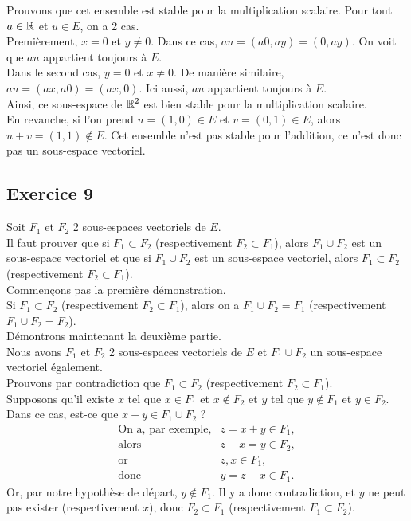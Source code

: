 \documentclass[12pt]{book}
\begin{document}
Prouvons que cet ensemble est stable pour la multiplication scalaire. Pour tout $a\in\mathbb{R}$ et $u\in E$, on a 2 cas.\\
Premièrement, $x=0$ et $y\ne 0$. Dans ce cas, $au=(a0,ay)=(0,ay)$. On voit que $au$ appartient toujours à $E$.\\
Dans le second cas, $y=0$ et $x\ne 0$. De manière similaire, $au=(ax,a0)=(ax,0)$. Ici aussi, $au$ appartient toujours à $E$.\\
Ainsi, ce sous-espace de $\mathbb{R}^2$ est bien stable pour la multiplication scalaire.\\

En revanche, si l’on prend $u=(1,0)\in E$ et $v=(0,1)\in E$, alors $u+v=(1,1)\notin E$. Cet ensemble n’est pas stable pour l’addition, ce n’est donc pas un sous-espace vectoriel.

\subsection*{Exercice 9}

Soit $F_1$ et $F_2$ 2 sous-espaces vectoriels de $E$.\\
Il faut prouver que si $F_1\subset F_2$ (respectivement $F_2\subset F_1$), alors $F_1\cup F_2$ est un sous-espace vectoriel et que si $F_1\cup F_2$ est un sous-espace vectoriel, alors $F_1\subset F_2$ (respectivement $F_2\subset F_1$).\\
\indent
Commençons pas la première démonstration.\\
Si $F_1\subset F_2$ (respectivement $F_2\subset F_1$), alors on a $F_1\cup F_2=F_1$ (respectivement $F_1\cup F_2 = F_2$).\\
Démontrons maintenant la deuxième partie.\\
Nous avons $F_1$ et $F_2$ 2 sous-espaces vectoriels de $E$ et $F_1\cup F_2$ un sous-espace vectoriel également.\\
Prouvons par contradiction que $F_1\subset F_2$ (respectivement $F_2\subset F_1$).\\
Supposons qu’il existe $x$ tel que $x\in F_1$ et $x\notin F_2$ et $y$ tel que $y\notin F_1$ et $y\in F_2$.\\
Dans ce cas, est-ce que $x+y\in F_1\cup F_2$ ?\\
$$
\begin{array}{rl}
    \textrm{On a, par exemple,} & z=x+y\in F_1,\\
    \textrm{alors} & z-x=y\in F_2,\\
    \textrm{or} & z,x\in F_1,\\
    \textrm{donc} & y=z-x\in F_1.
\end{array}
$$
Or, par notre hypothèse de départ, $y\notin F_1$. Il y a donc contradiction, et $y$ ne peut pas exister (respectivement $x$), donc $F_2\subset F_1$ (respectivement $F_1\subset F_2$).
    
\end{document}
